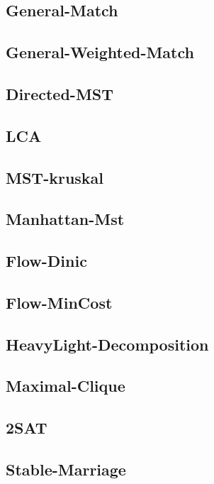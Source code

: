 \documentclass[a4paper,10pt,twocolumn,oneside]{article}
\begin{document}
\subsection{General-Match}

\subsection{General-Weighted-Match}

\subsection{Directed-MST}

\subsection{LCA}

\subsection{MST-kruskal}

\subsection{Manhattan-Mst}

\subsection{Flow-Dinic}

\subsection{Flow-MinCost}

\subsection{HeavyLight-Decomposition}

\subsection{Maximal-Clique}

\subsection{2SAT}

\subsection{Stable-Marriage}

\end{document}
